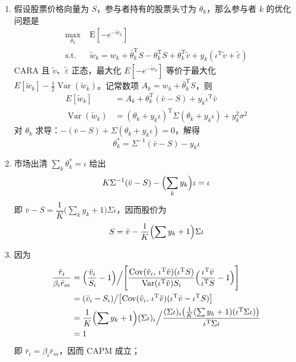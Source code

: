 \begin{solution}
\begin{enumerate}[label=(\alph*)]
    \item 假设股票价格向量为 $S$，参与者持有的股票头寸为 $\theta_{k}$，那么参与者 $k$ 的优化问题是
    \[
        \begin{aligned}
            \max_{\theta_{k}}\;&\mathrm{E}[-e^{-\tilde{w}_{k}}]\\
            \text{s.t.}\;&\tilde{w}_{k}=w_{k}+\bar{\theta}_{k}^{\mathrm{T}}S-\theta_{k}^{\mathrm{T}}S+\theta_{k}^{\mathrm{T}}\tilde{v}+y_{k}(\iota^{\mathrm{T}}\tilde{v}+\tilde{\varepsilon})
        \end{aligned}
    \]
    CARA 且 $\tilde{v}$、$\tilde{\varepsilon}$ 正态，最大化 $E[-e^{-\tilde{w}_{k}}]$ 等价于最大化 $E[\tilde{w}_{k}]-\tfrac12\operatorname{Var}(\tilde{w}_{k})$。记常数项 $A_{k}=w_{k}+\bar{\theta}_{k}^{\mathrm{T}}S$，则
    \[
        \begin{aligned}
            E[\tilde{w}_{k}]&=A_{k}+\theta_{k}^{\mathrm{T}}(\bar{v}-S)+y_{k}\iota^{\mathrm{T}}\bar{v}\\
            \operatorname{Var}(\tilde{w}_{k})&=(\theta_{k}+y_{k}\iota)^{\mathrm{T}}\Sigma(\theta_{k}+y_{k}\iota)+y_{k}^{2}\sigma^{2}
        \end{aligned}
    \]
    对 $\theta_{k}$ 求导：$-(\bar{v}-S)+\Sigma(\theta_{k}+y_{k}\iota)=0$，解得
    \[
        \theta_{k}^{*}=\Sigma^{-1}(\bar{v}-S)-y_{k}\iota
    \]

    \item 市场出清 $\sum_{k}\theta_{k}^{*}=\iota$ 给出
    \[
        K\Sigma^{-1}(\bar{v}-S)-\Bigl(\sum_{k}y_{k}\Bigr)\iota=\iota
    \]
    即 $\bar{v}-S=\dfrac{1}{K}\bigl(\sum_{k}y_{k}+1\bigr)\Sigma\iota$，因而股价为
    \[
        S=\bar{v}-\frac{1}{K}\Bigl(\sum y_{k}+1\Bigr)\Sigma\iota
    \]

    \item 因为
    \[
        \begin{aligned}
            \frac{\bar{r}_{i}}{\beta_{i}\bar{r}_{m}}
            &=\Bigl(\frac{\bar{v}_{i}}{S_{i}}-1\Bigr)\Big/\Biggl[\frac{\operatorname{Cov}(\tilde{v}_{i},\,\iota^{\mathrm{T}}\tilde{v})(\iota^{\mathrm{T}}S)}{\operatorname{Var}(\iota^{\mathrm{T}}\tilde{v})S_{i}}\Bigl(\frac{\iota^{\mathrm{T}}\bar{v}}{\iota^{\mathrm{T}}S}-1\Bigr)\Biggr]\\
            &=(\bar{v}_{i}-S_{i})\big/\bigl[\operatorname{Cov}(\tilde{v}_{i},\,\iota^{\mathrm{T}}\tilde{v})(\iota^{\mathrm{T}}\bar{v}-\iota^{\mathrm{T}}S)\bigr]\\
            &=\frac{1}{K}\Bigl(\sum y_{k}+1\Bigr)(\Sigma\iota)_{i}\Big/\frac{(\Sigma\iota)_{i}\bigl(\tfrac{1}{K}(\sum y_{k}+1)(\iota^{\mathrm{T}}\Sigma\iota)\bigr)}{\iota^{\mathrm{T}}\Sigma\iota}\\
            &=1
        \end{aligned}
    \]
    即 $\bar{r}_{i}=\beta_{i}\bar{r}_{m}$，因而 CAPM 成立；


\end{enumerate}
\end{solution}
